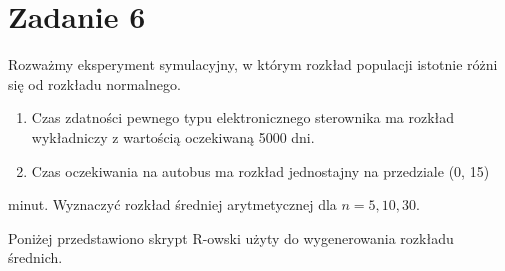 \documentclass{article}
\begin{document}
\section*{Zadanie 6}
Rozważmy eksperyment symulacyjny, w którym rozkład populacji istotnie różni się od
rozkładu normalnego.
\begin{enumerate}[label = \alph*)]
\item Czas zdatności pewnego typu elektronicznego sterownika ma rozkład
wykładniczy z wartością oczekiwaną 5000 dni.
\item Czas oczekiwania na autobus ma rozkład jednostajny na przedziale (0, 15)
\end{enumerate}
minut.
Wyznaczyć rozkład średniej arytmetycznej dla $n = 5, 10, 30$. \\ \par
Poniżej przedstawiono skrypt R-owski użyty do wygenerowania rozkładu średnich.
\end{document}
